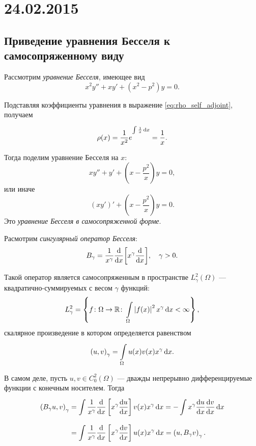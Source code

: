 \section{24.02.2015}
\subsection{Приведение уравнения Бесселя к самосопряженному виду}
Рассмотрим \emph{уравнение Бесселя}, имеющее вид
\[ x^2 y'' + xy' + (x^2 - p^2)y = 0. \]

Подставляя коэффициенты уравнения в выражение \ref{eq:rho_self_adjoint}, получаем
\[ \rho(x) = \frac{1}{x^2} e^{\int\limits_{}^{} \frac{1}{x} \,\mathrm{d}{x}} = \frac{1}{x}. \]

Тогда поделим уравнение Бесселя на $x$:
\[ xy'' + y' + \left(x - \frac{p^2}{x}\right) y = 0, \]
или иначе
\[ (xy')' + \left(x - \frac{p^2}{x}\right) y = 0. \]
Это \emph{уравнение Бесселя в самосопряженной форме}.

Расмотрим \emph{сингулярный оператор Бесселя}:
\[B_\gamma = \frac{1}{x^\gamma} \frac{\mathrm{d}}{\mathrm{d}x}{\left[x^\gamma \frac{\mathrm{d}}{\mathrm{d}x}\right]}, \quad \gamma > 0. \]

Такой оператор является самосопряженным в пространстве $L_\gamma^2(\Omega)$ --- квадратично-суммируемых с весом $\gamma$ функций:
\[ L_\gamma^2 = \left\{ f \colon \Omega \to \mathbb{R} \colon \int\limits_{\Omega}^{} \left|f(x)\right|^2 x^\gamma \,\mathrm{d}{x} < \infty \right\}, \]
скалярное произведение в котором определяется равенством
\[ \left( u, v \right)_\gamma = \int\limits_{\Omega}^{} u(x)v(x) x^\gamma \,\mathrm{d}{x}. \]

В самом деле, пусть $u, v \in C_0^2(\Omega)$ --- дважды непрерывно дифференцируемые функции с конечным носителем. Тогда
\begin{equation*}
\begin{split}
    \left( B_\gamma u, v \right)_\gamma &= \int\limits_{}^{} \frac{1}{x^\gamma} \frac{\mathrm{d}}{\mathrm{d}x}\left[x^\gamma \frac{\mathrm{d}u}{\mathrm{d}x}\right] v(x) x^\gamma \,\mathrm{d}{x} = -\int\limits_{}^{} x^\gamma \frac{\mathrm{d}u}{\mathrm{d}x} \frac{\mathrm{d}v}{\mathrm{d}x} \,\mathrm{d}{x} \\
    &= \int\limits_{}^{} \frac{1}{x^\gamma} \frac{\mathrm{d}}{\mathrm{d}x}\left[x^\gamma \frac{\mathrm{d}v}{\mathrm{d}x}\right] u(x) x^\gamma \,\mathrm{d}{x} = \left( u, B_\gamma v \right)_\gamma.
\end{split}
\end{equation*}
